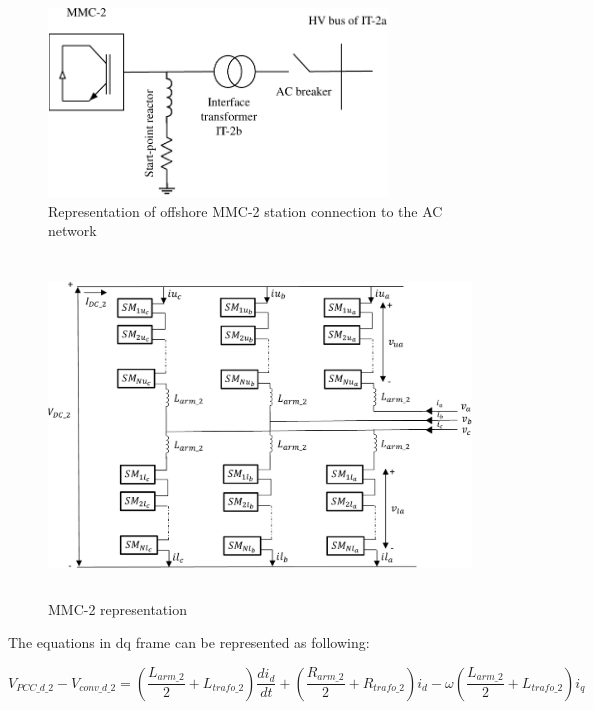 \begin{figure}[H]
\centering
    \includegraphics[height = 5cm,width = 9cm]{Diagrams/Chapter_4/MMC_pow_system_1_new.pdf}
    \caption{Representation of offshore MMC-2 station connection to the AC network \cite{saad2015modelisation}}
    \label{fig:MMC_pow_system_1}
\end{figure}

\begin{figure}[H]
\centering
    \includegraphics[height = 9cm,width = 13.5cm]{Diagrams/Chapter_4/MMC_pow_system_2.pdf}
    \caption{MMC-2 representation \cite{saad2015modelisation}}
    \label{fig:MMC_pow_system_2}
\end{figure}

The equations in dq frame can be represented as following:

\begin{equation}
    V_{PCC\_d\_2} - V_{conv\_d\_2} = \left(\frac{L_{arm\_2}}{2} + L_{trafo\_2}\right)\frac{di_{d}}{dt} +\left (\frac{R_{arm\_2}}{2}+R_{trafo\_2}\right)i_d-\omega\left(\frac{L_{arm\_2}}{2}+L_{trafo\_2}\right)i_q
\end{equation}

